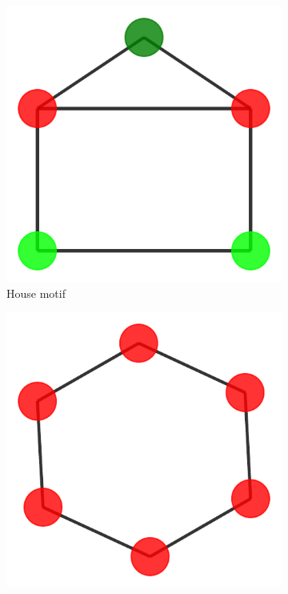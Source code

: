 \begin{figure}[h]
    \centering
    \begin{subfigure}[b]{0.2\textwidth}
        \includegraphics[width=\linewidth]{img/Motif_Vis/BA-Shapes-MOTIF.pdf}
        \caption{House motif}
        \label{fig:subfig1}
    \end{subfigure}
    \begin{subfigure}[b]{0.2\textwidth}
        \includegraphics[width=\linewidth]{img/Motif_Vis/Tree-Cycles-MOTIF.pdf}

\end{subfigure}
\end{figure}
